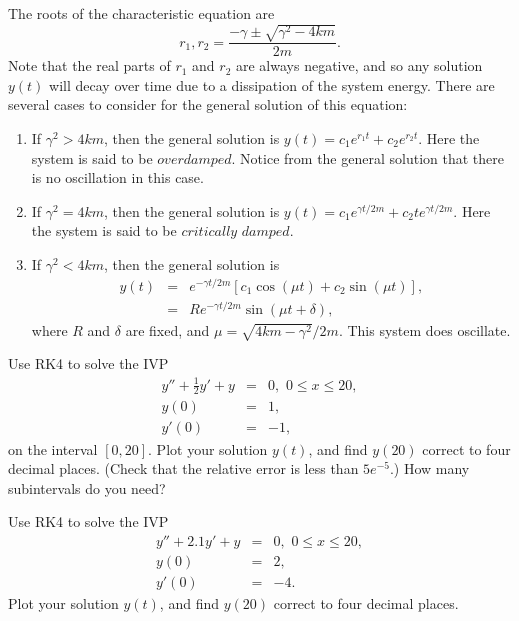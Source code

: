 The roots of the characteristic equation are \[r_1,r_2 = \frac{-\gamma \pm \sqrt{\gamma^2 -4km}}{2m} .\]
Note that the real parts of $r_1$ and $r_2$ are always negative, and so any solution $y(t)$ will decay over time due to a dissipation of the system energy. There are several cases to consider for the general solution of this equation: 
\begin{enumerate}
\item If $\gamma^2 > 4km$, then the general solution is $y(t) = c_1 e^{r_1t} + c_2e^{r_2t}$. Here the system is said to be $\textit{overdamped}$. Notice from the general solution that there is no oscillation in this case.
\item If $\gamma^2 = 4km$, then the general solution is $y(t) = c_1 e^{\gamma t/2m} + c_2 te^{\gamma t/2m}$. Here the system is said to be $\textit{critically damped}$. 
\item If $\gamma^2 < 4km$, then the general solution is 
\begin{eqnarray*}
y(t) &=& e^{-\gamma t/2m} \left[c_1\cos(\mu t) + c_2 \sin (\mu t)\right],\\
&=& R e^{-\gamma t/2m}  \sin (\mu t + \delta),
\end{eqnarray*}
where $R$ and $\delta$ are fixed, and $\mu = \sqrt{4km-\gamma^2}/2m.$ This system does oscillate.
\end{enumerate}



\begin{problem}
Use RK4 to solve the IVP
\begin{eqnarray*}
y'' +\frac{1}{2} y'+ y &=& 0, \,\, 0 \leq x \leq 20,\\
y(0) &=& 1, \\
y'(0) &=& -1,
\end{eqnarray*} 
on the interval $[0,20]$. Plot your solution $y(t)$, and find $y(20)$ correct to four decimal places. (Check that the relative error is less than $5e^{-5}$.)  How many subintervals do you need?
\end{problem}



\begin{problem}
Use RK4 to solve the IVP
\begin{eqnarray*}
y'' +2.1 y'+ y &=& 0,\,\, 0 \leq x \leq 20,\\
y(0) &=& 2, \\
y'(0) &=& -4.
\end{eqnarray*} 
Plot your solution $y(t)$, and find $y(20)$ correct to four decimal places. 
\end{problem}


